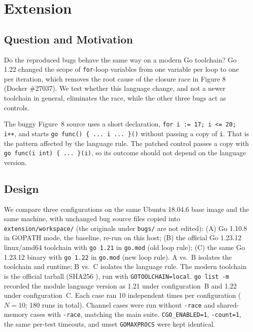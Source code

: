 \section{Extension}
\label{sec:extension}

\subsection{Question and Motivation}
Do the reproduced bugs behave the same way on a modern Go toolchain? Go 1.22 changed
the scope of \texttt{for}-loop variables from one variable per loop to one per
iteration, which removes the root cause of the closure race in Figure 8 (Docker
\#27037). We test whether this language change, and not a newer toolchain in general,
eliminates the race, while the other three bugs act as controls.

The buggy Figure~8 source uses a short declaration,
\texttt{for i := 17; i <= 20; i++}, and starts \texttt{go func() \{ ... i ... \}()}
without passing a copy of \texttt{i}. That is the pattern affected by the language
rule. The patched control passes a copy with \texttt{go func(i int) \{ ... \}(i)},
so its outcome should not depend on the language version.

\subsection{Design}
We compare three configurations on the same Ubuntu 18.04.6 base image and the same
machine, with unchanged bug source files copied into \texttt{extension/workspace/}
(the originals under \texttt{bugs/} are not edited):
(A) Go 1.10.8 in GOPATH mode, the baseline, re-run on this host;
(B) the official Go 1.23.12 linux/amd64 toolchain with \texttt{go 1.21} in
\texttt{go.mod} (old loop rule);
(C) the same Go 1.23.12 binary with \texttt{go 1.22} in \texttt{go.mod} (new loop rule).
A vs.\ B isolates the toolchain and runtime; B vs.\ C isolates the language rule.
The modern toolchain is the official tarball
(SHA256 ),
run with \texttt{GOTOOLCHAIN=local}.
\texttt{go list -m} recorded the module language version as 1.21 under configuration~B
and 1.22 under configuration~C.
Each case ran 10 independent times per configuration ($N=10$; 180 runs in total).
Channel cases were run without \texttt{-race} and shared-memory cases with
\texttt{-race}, matching the main suite. \texttt{CGO\_ENABLED=1}, \texttt{-count=1},
the same per-test timeouts, and unset \texttt{GOMAXPROCS} were kept identical.

